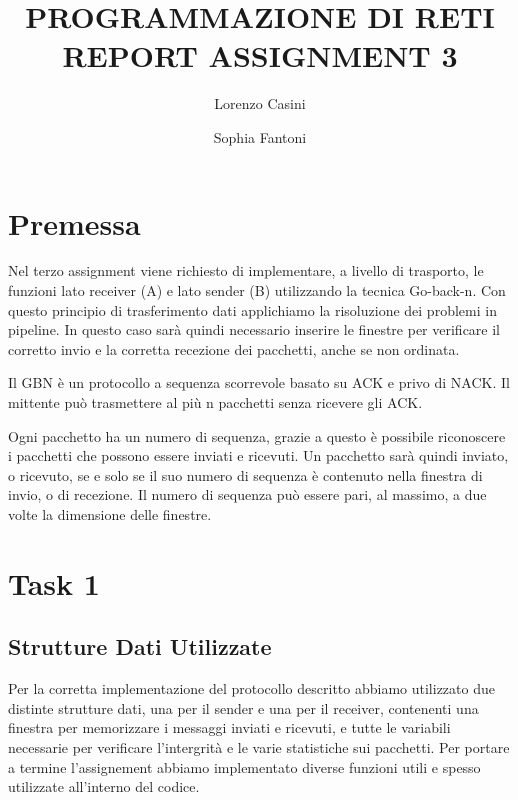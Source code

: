 \documentclass[a4paperr]{article}
\begin{document}
\author{Lorenzo Casini \and Sophia Fantoni}
\title{PROGRAMMAZIONE DI RETI \\ REPORT ASSIGNMENT 3}
\maketitle

\newpage

\tableofcontents	%

\newpage

\section{Premessa}
Nel terzo assignment viene richiesto di implementare, a livello di trasporto, le funzioni lato receiver (A) e lato sender (B) utilizzando la tecnica Go-back-n. Con questo principio di trasferimento dati applichiamo la risoluzione dei problemi in pipeline. In questo caso sarà quindi necessario inserire le finestre per verificare il corretto invio e la corretta recezione dei pacchetti, anche se non ordinata. 
\par Il GBN è un protocollo a sequenza scorrevole basato su ACK e privo di NACK. Il mittente può trasmettere al più n pacchetti senza ricevere gli ACK. 
\par Ogni pacchetto ha un numero di sequenza, grazie a questo è possibile riconoscere i pacchetti che possono essere inviati e ricevuti. Un pacchetto sarà quindi inviato, o ricevuto, se e solo se il suo numero di sequenza è contenuto nella finestra di invio, o di recezione. Il numero di sequenza può essere pari, al massimo, a due volte la dimensione delle finestre.  

\section{Task 1}

\subsection{Strutture Dati Utilizzate}
Per la corretta implementazione del protocollo descritto abbiamo utilizzato due distinte strutture dati, una per il sender e una per il receiver, contenenti una finestra per memorizzare i messaggi inviati e ricevuti, e tutte le variabili necessarie per verificare l'intergrità e le varie statistiche sui pacchetti. Per portare a termine l'assignement abbiamo implementato diverse funzioni utili e spesso utilizzate all'interno del codice.
\end{document}
